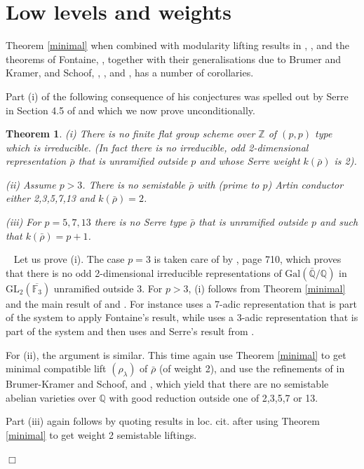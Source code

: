 \documentclass[12pt]{article}
\newcommand{\Q}{\mathbb{Q}}
\newcommand{\Z}{\mathbb{Z}}
\newtheorem{theorem}{Theorem}[section]
\newenvironment{proof}{\smallskip\noindent{\bf Proof.}\
}{$\Box$\smallskip\goodbreak}
\def\rhob{ {\bar {\rho} } }
\newcommand{\Galois}{\mathrm{Gal}}
\newcommand{\Gal}{\Galois( \bar{ {\mathbb Q}}/{\mathbb Q})}
\begin{document}
\section{Low levels and weights}

Theorem \ref{minimal} when combined with modularity lifting results in
\cite{Wiles}, \cite{SW2}, and the theorems of Fontaine,
\cite{Fontaine},
together with  their generalisations due to Brumer and Kramer, and Schoof, \cite{BK},
\cite{Schoof1},  and \cite{Schoof2},
has a number of corollaries.

Part (i) of the following consequence of his conjectures was spelled out by
Serre in Section 4.5 of \cite{Serre3} and which we now prove unconditionally.

\begin{theorem}\label{lowlevel}
 (i) There is no finite flat group scheme over $\Z$ of $(p,p)$ type which is
 irreducible. (In fact there is no irreducible, odd 2-dimensional
 representation
 $\rhob$ that is unramified outside $p$ and whose Serre weight
 $k(\rhob)$ is 2). 

(ii) Assume $p>3$. There is no semistable $\rhob$ with
 (prime to $p$) Artin conductor either 2,3,5,7,13 
 and $k(\rhob)=2$.

 (iii) For $p=5,7,13$ there is no Serre type $\rhob$ that is
 unramified outside $p$ and such that $k(\rhob)=p+1$.

\end{theorem}

\begin{proof} Let us prove (i). 
The case $p=3$ is taken care of by \cite{Serre2}, page 710, which proves
that
there is no odd 2-dimensional irreducible representations of
$\Gal$ in $\mathrm{GL}_2 ({\overline{\mathbb{F}_{3}}})$
unramified
outside $3$.
For $p>3$,  (i)
follows from Theorem \ref{minimal} and the main result
of \cite{D} and \cite{Wint}.
For instance \cite{Wint} uses a 7-adic representation
that is part of the system to apply Fontaine's result, while \cite{D} uses
a 3-adic  representation
that is part of the system and then uses
\cite{SW2} and Serre's result from \cite{Serre2}.

For (ii), the argument is similar. This time again
use
Theorem
\ref{minimal} to get minimal compatible lift $(\rho_\lambda)$ of
$\rhob$ (of weight 2), and
use the refinements of \cite{Fontaine}
in Brumer-Kramer and Schoof, \cite{BK} and \cite{Schoof1}, which yield that
there are
no semistable abelian varieties over $\Q$ with good reduction
outside one of   2,3,5,7 or 13.

Part (iii) again follows by quoting results in loc. cit. after using
Theorem \ref{minimal} to get weight 2 semistable liftings.

\end{proof}
\end{document}

